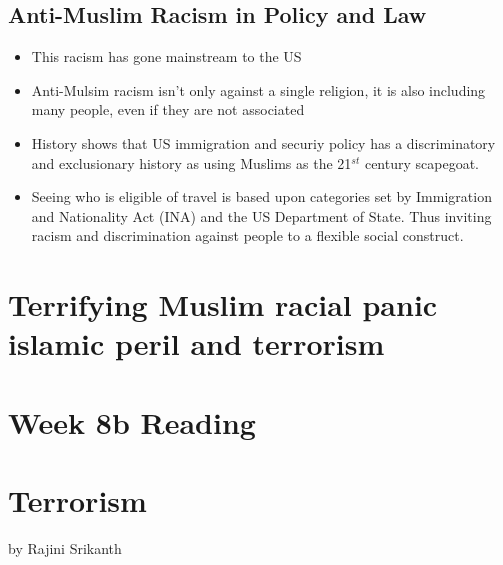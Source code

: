 \documentclass{article}
\begin{document}
  \subsection{Anti-Muslim Racism in Policy and Law}
  \begin{itemize}
    \item This racism has gone mainstream to the US
    \item Anti-Mulsim racism isn't only against a single religion, it is
      also including many people, even if they are not associated
    \item History shows that US immigration and securiy policy
      has a discriminatory and exclusionary history as using
      Muslims as the 21$^{st}$ century scapegoat.
    \item Seeing who is eligible of travel is based upon categories set by
      Immigration and Nationality Act (INA) and the US Department of State.
      Thus inviting racism and discrimination against people to a flexible social
      construct.
  \end{itemize}

  \section{Terrifying Muslim racial panic islamic peril and terrorism}


\section*{Week 8b Reading}

\section{Terrorism}
by Rajini Srikanth
\end{document}
